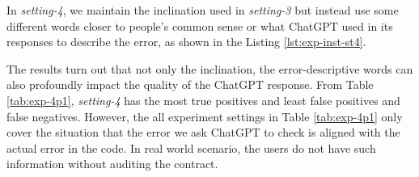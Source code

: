 

In \textit{setting-4}, we maintain the inclination used in \textit{setting-3} but instead use some different words closer to people's common sense or what ChatGPT used in its responses to describe the error, as shown in the Listing \ref{lst:exp-inst-st4}.

{  \color{red}
The results turn out that not only the inclination, the error-descriptive words can also profoundly impact the quality of the ChatGPT response. From Table \ref{tab:exp-4p1}, \textit{setting-4} has the most true positives and least false positives and false negatives. However, the all experiment settings in  Table \ref{tab:exp-4p1} only cover the situation that the error we ask ChatGPT to check is aligned with the actual error in the code. In real world scenario, the users do not have such information without auditing the contract.
}




